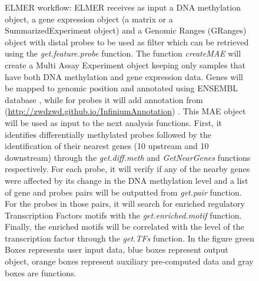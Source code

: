 \begin{figure}
    \caption{ELMER workflow: ELMER receives as input a DNA methylation object, a gene expression object (a matrix or a SummarizedExperiment object) and a Genomic Ranges (GRanges) object with distal probes to be used as filter which can be retrieved using the \textit{get.feature.probe} function. The function \textit{createMAE}  will create a Multi Assay Experiment object keeping only samples that have both DNA methylation and gene expression data. Genes will be mapped to genomic position and annotated using ENSEMBL database \cite{doi:10.1093/database/baw093}, while for probes it will add annotation from \citeauthor{doi:10.1093/nar/gkw967} (\href{http://zwdzwd.github.io/InfiniumAnnotation}{http://zwdzwd.github.io/InfiniumAnnotation}) . This MAE object will be used as input to the next analysis functions. First, it identifies differentially methylated probes followed by the identification of their nearest genes (10 upstream and 10 downstream) through the  \textit{get.diff.meth} and  \textit{GetNearGenes} functions respectively. For each probe, it will verify if any of the nearby genes were affected by its change in the DNA methylation level and a list of  gene and probes pairs will be outputted from \textit{get.pair} function. For the probes in those pairs, it will search for enriched regulatory Transcription Factors motifs with the  \textit{get.enriched.motif} function. Finally, the  enriched motifs will be correlated with the level of the transcription factor through the \textit{get.TFs} function. In the figure green Boxes represents user input data, blue boxes represent output object, orange boxes represent auxiliary pre-computed data and gray boxes are functions.}
\label{ig:elmerworkflow}
\end{figure}
